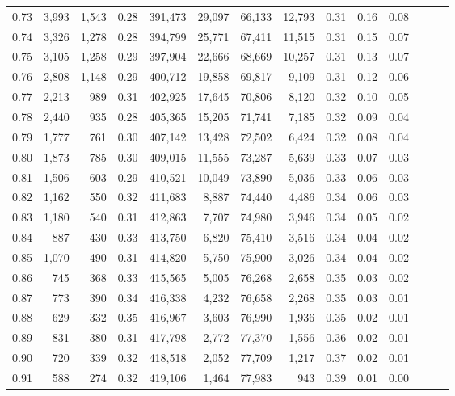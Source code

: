 \begin{tabular}{rrrrrrrrrrrrrr}
0.73 &  3,993 &  1,543 &  0.28 &  391,473 &   29,097 &  66,133 &  12,793 &  0.31 &  0.16 &      0.08 \\
0.74 &  3,326 &  1,278 &  0.28 &  394,799 &   25,771 &  67,411 &  11,515 &  0.31 &  0.15 &      0.07 \\
0.75 &  3,105 &  1,258 &  0.29 &  397,904 &   22,666 &  68,669 &  10,257 &  0.31 &  0.13 &      0.07 \\
0.76 &  2,808 &  1,148 &  0.29 &  400,712 &   19,858 &  69,817 &   9,109 &  0.31 &  0.12 &      0.06 \\
0.77 &  2,213 &    989 &  0.31 &  402,925 &   17,645 &  70,806 &   8,120 &  0.32 &  0.10 &      0.05 \\
0.78 &  2,440 &    935 &  0.28 &  405,365 &   15,205 &  71,741 &   7,185 &  0.32 &  0.09 &      0.04 \\
0.79 &  1,777 &    761 &  0.30 &  407,142 &   13,428 &  72,502 &   6,424 &  0.32 &  0.08 &      0.04 \\
0.80 &  1,873 &    785 &  0.30 &  409,015 &   11,555 &  73,287 &   5,639 &  0.33 &  0.07 &      0.03 \\
0.81 &  1,506 &    603 &  0.29 &  410,521 &   10,049 &  73,890 &   5,036 &  0.33 &  0.06 &      0.03 \\
0.82 &  1,162 &    550 &  0.32 &  411,683 &    8,887 &  74,440 &   4,486 &  0.34 &  0.06 &      0.03 \\
0.83 &  1,180 &    540 &  0.31 &  412,863 &    7,707 &  74,980 &   3,946 &  0.34 &  0.05 &      0.02 \\
0.84 &    887 &    430 &  0.33 &  413,750 &    6,820 &  75,410 &   3,516 &  0.34 &  0.04 &      0.02 \\
0.85 &  1,070 &    490 &  0.31 &  414,820 &    5,750 &  75,900 &   3,026 &  0.34 &  0.04 &      0.02 \\
0.86 &    745 &    368 &  0.33 &  415,565 &    5,005 &  76,268 &   2,658 &  0.35 &  0.03 &      0.02 \\
0.87 &    773 &    390 &  0.34 &  416,338 &    4,232 &  76,658 &   2,268 &  0.35 &  0.03 &      0.01 \\
0.88 &    629 &    332 &  0.35 &  416,967 &    3,603 &  76,990 &   1,936 &  0.35 &  0.02 &      0.01 \\
0.89 &    831 &    380 &  0.31 &  417,798 &    2,772 &  77,370 &   1,556 &  0.36 &  0.02 &      0.01 \\
0.90 &    720 &    339 &  0.32 &  418,518 &    2,052 &  77,709 &   1,217 &  0.37 &  0.02 &      0.01 \\
0.91 &    588 &    274 &  0.32 &  419,106 &    1,464 &  77,983 &     943 &  0.39 &  0.01 &      0.00 \\

\end{tabular}
